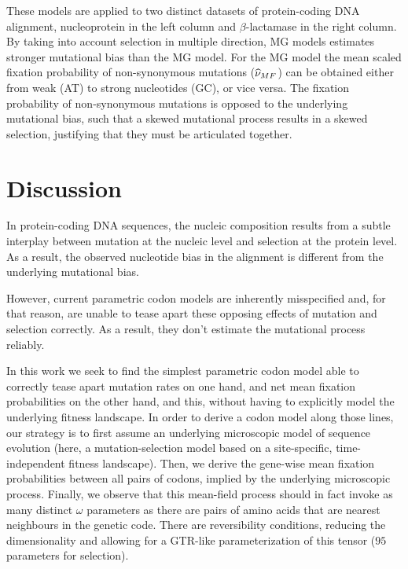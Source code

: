 \begin{table}[htbp]
{    These models are applied to two distinct datasets of protein-coding DNA alignment, nucleoprotein in the left column and $\beta$-lactamase in the right column.
    By taking into account selection in multiple direction, MG models estimates stronger mutational bias than the MG model.
    For the MG model the mean scaled fixation probability of non-synonymous mutations ($\widehat{\nu}_{MF}$) can be obtained either from weak (AT) to strong nucleotides (GC), or vice versa.
    The fixation probability of non-synonymous mutations is opposed to the underlying mutational bias, such that a skewed mutational process results in a skewed selection, justifying that they must be articulated together.
    }
    \label{tab:mut-bias-estimation}
\end{table}


\section{Discussion}\label{sec:discussion}

In protein-coding DNA sequences, the nucleic composition results from a subtle interplay between mutation at the nucleic level and selection at the protein level.
As a result, the observed nucleotide bias in the alignment is different from the underlying mutational bias.

However, current parametric codon models are inherently misspecified and, for that reason, are unable to tease apart these opposing effects of mutation and selection correctly.
As a result, they don’t estimate the mutational process reliably.

In this work we seek to find the simplest parametric codon model able to correctly tease apart mutation rates on one hand, and net mean fixation probabilities on the other hand, and this, without having to explicitly model the underlying fitness landscape.
In order to derive a codon model along those lines, our strategy is to first assume an underlying microscopic model of sequence evolution (here, a mutation-selection model based on a site-specific, time-independent fitness landscape).
Then, we derive the gene-wise mean fixation probabilities between all pairs of codons, implied by the underlying microscopic process.
Finally, we observe that this mean-field process should in fact invoke as many distinct $\omega$ parameters as there are pairs of amino acids that are nearest neighbours in the genetic code.
There are reversibility conditions, reducing the dimensionality and allowing for a GTR-like parameterization of this tensor ($95$ parameters for selection).

